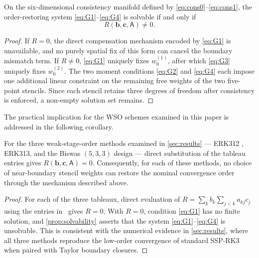 \documentclass[review,hidelinks,onefignum,onetabnum]{siamart251216}
\begin{document}
\begin{proposition}
\label{prop:solvability}
On the six-dimensional consistency manifold defined by \eqref{eq:cons0}--\eqref{eq:cons1}, the order-restoring system \eqref{eq:G1}--\eqref{eq:G4} is solvable if and only if
\begin{equation}
  R(\mathbf b,\mathbf c,\mathsf A)\neq 0.
  \label{eq:solvability-cond}
\end{equation}
\end{proposition}

\begin{proof}
If $R=0$, the direct compensation mechanism encoded by \eqref{eq:G1} is unavailable, and no purely spatial fix of this form can cancel the boundary mismatch term. If $R\neq 0$, \eqref{eq:G1} uniquely fixes $w_0^{(1)}$, after which \eqref{eq:G3} uniquely fixes $w_0^{(2)}$. The two moment conditions \eqref{eq:G2} and \eqref{eq:G4} each impose one additional linear constraint on the remaining free weights of the two five-point stencils. Since each stencil retains three degrees of freedom after consistency is enforced, a non-empty solution set remains.
\end{proof}

The practical implication for the WSO schemes examined in this paper is addressed in the following corollary.

\begin{corollary}
\label{cor:wso}
For the three weak-stage-order methods examined in \cref{sec:results} --- ERK312 \cite{Skvortsov2017}, ERK313, and the Biswas $(5,3,3)$ design \cite{Biswas2023} --- direct substitution of the tableau entries gives $R(\mathbf b,\mathbf c,\mathsf A)=0$. Consequently, for each of these methods, no choice of near-boundary stencil weights can restore the nominal convergence order through the mechanism described above.
\end{corollary}

\begin{proof}
For each of the three tableaux, direct evaluation of $R=\sum_k b_k\sum_{j<k}a_{kj}c_j$ using the entries in~\cite[Table~1]{Biswas2024} gives $R=0$. With $R=0$, condition \eqref{eq:G1} has no finite solution, and \cref{prop:solvability} asserts that the system \eqref{eq:G1}--\eqref{eq:G4} is unsolvable. This is consistent with the numerical evidence in \cref{sec:results}, where all three methods reproduce the low-order convergence of standard SSP-RK3 when paired with Taylor boundary closures.
\end{proof}
\end{document}
